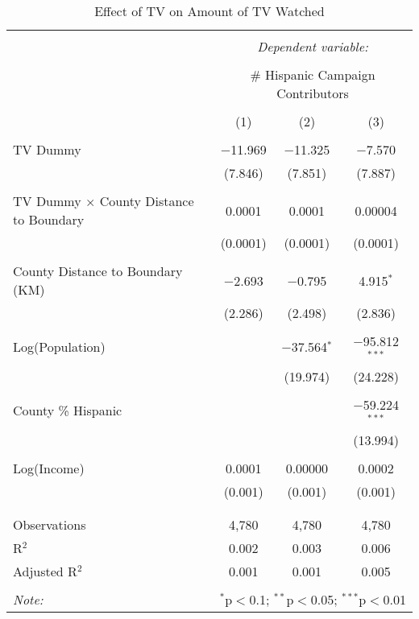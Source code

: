 
\begin{table}[!htbp] \centering 
  \caption{Effect of TV on Amount of TV Watched} 
  \label{} 
\begin{tabular}{@{\extracolsep{-5pt}}lccc} 
\\[-1.8ex]\hline 
\hline \\[-1.8ex] 
 & \multicolumn{3}{c}{\textit{Dependent variable:}} \\ 
\cline{2-4} 
\\[-1.8ex] & \multicolumn{3}{c}{\# Hispanic Campaign Contributors} \\ 
\\[-1.8ex] & (1) & (2) & (3)\\ 
\hline \\[-1.8ex] 
 TV Dummy & $-$11.969 & $-$11.325 & $-$7.570 \\ 
  & (7.846) & (7.851) & (7.887) \\ 
  & & & \\ 
 TV Dummy $\times$ County Distance to Boundary  & 0.0001 & 0.0001 & 0.00004 \\ 
  & (0.0001) & (0.0001) & (0.0001) \\ 
  & & & \\ 
 County Distance to Boundary (KM) & $-$2.693 & $-$0.795 & 4.915$^{*}$ \\ 
  & (2.286) & (2.498) & (2.836) \\ 
  & & & \\ 
 Log(Population) &  & $-$37.564$^{*}$ & $-$95.812$^{***}$ \\ 
  &  & (19.974) & (24.228) \\ 
  & & & \\ 
 County \% Hispanic &  &  & $-$59.224$^{***}$ \\ 
  &  &  & (13.994) \\ 
  & & & \\ 
 Log(Income) & 0.0001 & 0.00000 & 0.0002 \\ 
  & (0.001) & (0.001) & (0.001) \\ 
  & & & \\ 
\hline \\[-1.8ex] 
Observations & 4,780 & 4,780 & 4,780 \\ 
R$^{2}$ & 0.002 & 0.003 & 0.006 \\ 
Adjusted R$^{2}$ & 0.001 & 0.001 & 0.005 \\ 
\hline 
\hline \\[-1.8ex] 
\textit{Note:}  & \multicolumn{3}{r}{$^{*}$p$<$0.1; $^{**}$p$<$0.05; $^{***}$p$<$0.01} \\ 
\end{tabular} 
\end{table} 
